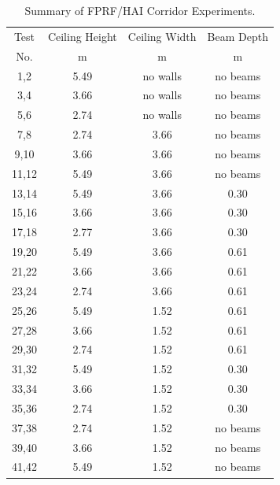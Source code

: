 \begin{table}[h!]
\caption{Summary of FPRF/HAI Corridor Experiments.}
\begin{center}
\begin{tabular}{|c|c|c|c|}
\hline
Test    &  Ceiling Height &  Ceiling Width &  Beam Depth  \\
No.     &  m              &  m             &  m           \\ \hline \hline
1,2     &  5.49           &  no walls      &  no beams    \\ \hline
3,4     &  3.66           &  no walls      &  no beams    \\ \hline
5,6     &  2.74           &  no walls      &  no beams    \\ \hline
7,8     &  2.74           &  3.66          &  no beams    \\ \hline
9,10    &  3.66           &  3.66          &  no beams    \\ \hline
11,12   &  5.49           &  3.66          &  no beams    \\ \hline
13,14   &  5.49           &  3.66          &  0.30        \\ \hline
15,16   &  3.66           &  3.66          &  0.30        \\ \hline
17,18   &  2.77           &  3.66          &  0.30        \\ \hline
19,20   &  5.49           &  3.66          &  0.61        \\ \hline
21,22   &  3.66           &  3.66          &  0.61        \\ \hline
23,24   &  2.74           &  3.66          &  0.61        \\ \hline
25,26   &  5.49           &  1.52          &  0.61        \\ \hline
27,28   &  3.66           &  1.52          &  0.61        \\ \hline
29,30   &  2.74           &  1.52          &  0.61        \\ \hline
31,32   &  5.49           &  1.52          &  0.30        \\ \hline
33,34   &  3.66           &  1.52          &  0.30        \\ \hline
35,36   &  2.74           &  1.52          &  0.30        \\ \hline
37,38   &  2.74           &  1.52          &  no beams    \\ \hline
39,40   &  3.66           &  1.52          &  no beams    \\ \hline
41,42   &  5.49           &  1.52          &  no beams    \\ \hline

\end{tabular}
\end{center}
\label{FPRF_HAI_Matrix}
\end{table}


